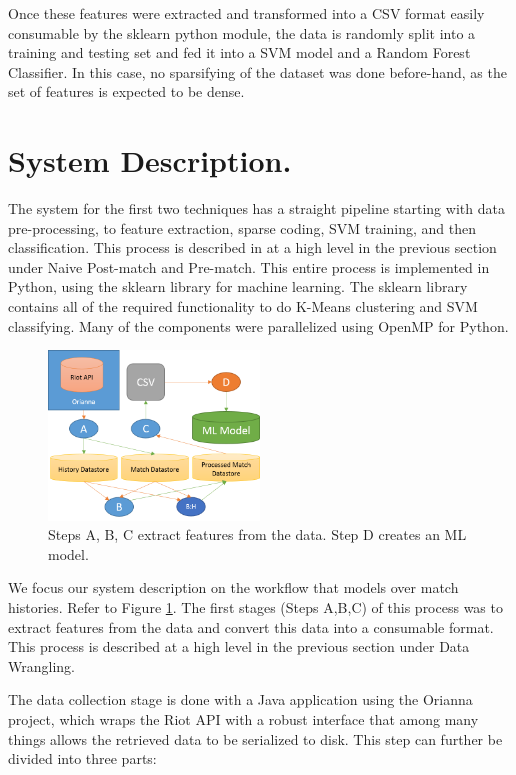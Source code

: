 Once these features were extracted and transformed into a CSV format easily consumable by the sklearn python module, the data is randomly split into a training and testing set and fed it into a SVM model and a Random Forest Classifier. In this case, no sparsifying of the dataset was done before-hand, as the set of features is expected to be dense.  

\section{System Description. }

The system for the first two techniques has a straight pipeline starting with data pre-processing, to feature extraction, sparse coding, SVM training, and then classification.  This process is described in at a high level in the previous section under Naive Post-match and Pre-match.  This entire process is implemented in Python, using the sklearn library for machine learning.  The sklearn library contains all of the required functionality to do K-Means clustering and SVM classifying.  Many of the components were parallelized using OpenMP for Python.  

\begin{figure}[t!]
  \centering
    \includegraphics[width=0.5\textwidth]{systemdescription}
  \caption{Steps A, B, C extract features from the data.  Step D creates an ML model.}
  \label{fig:systemdescription}
\end{figure}

We focus our system description on the workflow that models over match histories. Refer to Figure \ref{fig:systemdescription}. 
The first stages (Steps A,B,C) of this process was to extract features from the data and convert this data into a consumable format. This process is described at a high level in the previous section under Data Wrangling.

The data collection stage is done with a Java application using the Orianna project, which wraps the Riot API with a robust interface that among many things allows the retrieved data to be serialized to disk. This step can further be divided into three parts:

